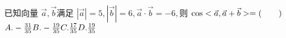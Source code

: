 \documentclass[class=ctexart,crop=false]{standalone}
\begin{document}
已知向量 $\vec{a},\vec{b}$满足 $|\vec{a}|=5,|\vec{b}|=6,
\vec{a}\cdot\vec{b}=-6,$则 $\cos<\vec{a},\vec{a}+\vec{b}> =\hfill (\qquad)\\$
$A. -\frac{31}{35}\hfill B. -\frac{19}{35}\hfill 
C. \frac{17}{35}\hfill D. \frac{19}{35}\hfill \quad \\ $
\end{document}
